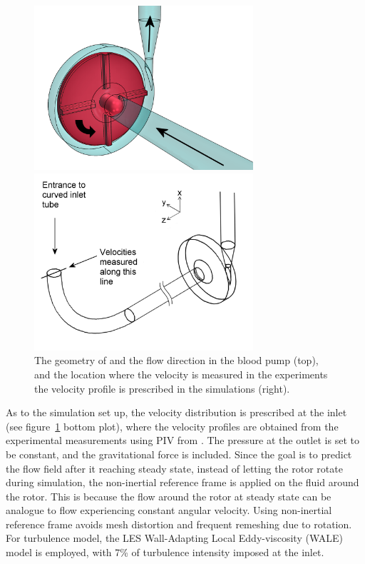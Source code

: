 \begin{figure}[htbp]
    \centering
    \begin{minipage}[c][2.5in][c]{0.9\linewidth}
        \centering
        \includegraphics[width=3.2in]{imgs/nozzle_pump/housing_and_rotor.png}
    \end{minipage}
    \begin{minipage}[c][2.5in][c]{0.9\linewidth}
        \centering
        \includegraphics[width=3.2in]{imgs/nozzle_pump/inlet_velcocity_profile_location.png}
    \end{minipage}
    \caption{The geometry of and the flow direction in the blood pump (top), and the location where the velocity is measured in the experiments the velocity profile is prescribed in the simulations (right).}
    \label{fig:pumpgeo}
\end{figure}

As to the simulation set up, the velocity distribution is prescribed at the inlet (see figure~\ref{fig:pumpgeo} bottom plot), where the velocity profiles are obtained from the experimental measurements using PIV from \cite{cpi}. The pressure at the outlet is set to be constant, and the gravitational force is included. Since the goal is to predict the flow field after it reaching steady state, instead of letting the rotor rotate during simulation, the non-inertial reference frame is applied on the fluid around the rotor. This is because the flow around the rotor at steady state can be analogue to flow experiencing constant angular velocity. Using non-inertial reference frame avoids mesh distortion and frequent remeshing due to rotation. For turbulence model, the LES Wall-Adapting Local Eddy-viscosity (WALE) model is employed, with 7\% of turbulence intensity imposed at the inlet. 

